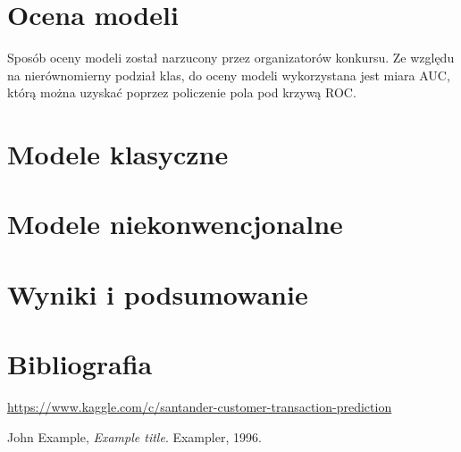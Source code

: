 \documentclass[12pt]{article}
\begin{document}
\section{Ocena modeli}

Sposób oceny modeli został narzucony przez organizatorów konkursu. Ze względu na nierównomierny podział klas, do oceny modeli wykorzystana jest miara AUC, którą można uzyskać poprzez policzenie pola pod krzywą ROC.


\section{Modele klasyczne}

\section{Modele niekonwencjonalne}

\section{Wyniki i podsumowanie}


\newpage

\section{Bibliografia}
\begin{thebibliography}{9}

\url{https://www.kaggle.com/c/santander-customer-transaction-prediction}

  John Example,
  \textit{Example title}.
  Exampler,
  1996.

\end{thebibliography}
\end{document}

